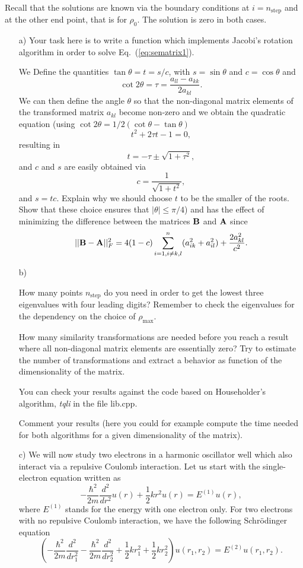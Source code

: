 \begin{prob}
Recall that the solutions are known via the boundary conditions at
$i=n_{\mathrm{step}}$ and at the other end point, that is for  $\rho_0$.
The solution is zero in both cases.




\begin{enumerate}
\item[a)] Your task here is to write a function which implements
Jacobi's rotation algorithm in order to
solve Eq.~(\ref{eq:sematrix1}). 

We 
Define the quantities $\tan\theta = t= s/c$, with $s=\sin\theta$ and $c=\cos\theta$ and
\[\cot 2\theta=\tau = \frac{a_{ll}-a_{kk}}{2a_{kl}}.
\]
We can then define the angle $\theta$ so that the non-diagonal matrix elements of the transformed matrix 
$a_{kl}$ become non-zero and
we obtain the quadratic equation (using $\cot 2\theta=1/2(\cot \theta-\tan\theta)$
\[
t^2+2\tau t-1= 0,
\]
resulting in 
\[
  t = -\tau \pm \sqrt{1+\tau^2},
\]
and $c$ and $s$ are easily obtained via
\[
   c = \frac{1}{\sqrt{1+t^2}},
\]
and $s=tc$.  
Explain why we should choose 
$t$ to be the smaller of the roots. Show that these choice  ensures that $|\theta| \le \pi/4$)
 and has the 
effect of minimizing the difference between the matrices ${\bf B}$ and ${\bf A}$ since
\[
||{\bf B}-{\bf A}||_F^2=4(1-c)\sum_{i=1,i\ne k,l}^n(a_{ik}^2+a_{il}^2) +\frac{2a_{kl}^2}{c^2}.
\]

\item[b)]


How many points $n_{\mathrm{step}}$
do you need in order to get the lowest three eigenvalues 
with four leading digits?  
Remember to check the eigenvalues for 
the dependency on the choice of $\rho_{\mathrm{max}}$.

How many similarity transformations are needed before you reach a 
result where all non-diagonal matrix elements are essentially zero?
Try to estimate the number of transformations and extract a behavior as function
of the dimensionality of the matrix.

You can check your results against the code based
on Householder's algorithm, {\em tqli} in the file lib.cpp.

Comment your results (here you could for example compute the time needed for 
both algorithms for a given dimensionality of the matrix).  

 
\item[c)] We will now study two electrons in a harmonic oscillator well which
also interact via a repulsive Coulomb interaction.
Let us start with the single-electron equation written as
\[
  -\frac{\hbar^2}{2 m} \frac{d^2}{dr^2} u(r) 
       + \frac{1}{2}k r^2u(r)  = E^{(1)} u(r),
\]
where $E^{(1)}$ stands for the energy with one electron only.
For two electrons with no repulsive Coulomb interaction, we have the following 
Schr\"odinger equation
\[
\left(  -\frac{\hbar^2}{2 m} \frac{d^2}{dr_1^2} -\frac{\hbar^2}{2 m} \frac{d^2}{dr_2^2}+ \frac{1}{2}k r_1^2+ \frac{1}{2}k r_2^2\right)u(r_1,r_2)  = E^{(2)} u(r_1,r_2) .
\]



\end{enumerate}
\end{prob}
